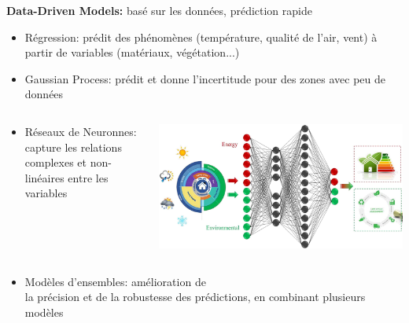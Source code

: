 \documentclass{beamer}
\begin{document}
\begin{frame}
    \small
    \textbf{Data-Driven Models:} basé sur les données, prédiction rapide %
    \begin{itemize}
        \item Régression: prédit des phénomènes (température, qualité de l'air, vent) à partir de variables (matériaux, végétation...) 
        \item Gaussian Process: prédit et donne l'incertitude pour des zones avec peu de données
    \end{itemize}
    \vspace{-0.3cm}
    \begin{columns}[T]
    \begin{column}{0.6\textwidth}
    \begin{itemize}
        \setlength\itemindent{0.3cm}
        \item Réseaux de Neuronnes: capture les relations complexes et non-linéaires entre les variables 
    \end{itemize}
    \end{column}

    \begin{column}{0.4\textwidth}
        \vspace{-0.3cm}
        \includegraphics[width=1\textwidth]{images/NN-env.jpg}
    \end{column}
    \end{columns}
    \vspace{-0.3cm}
    \begin{itemize}
        \item Modèles d'ensembles: amélioration de \\ la précision et de la robustesse des prédictions, en combinant plusieurs modèles
    \end{itemize}
\end{frame}
\end{document}
